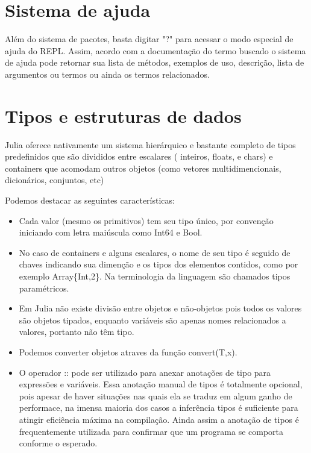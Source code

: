 \section{Sistema de ajuda}
Além do sistema de pacotes, basta digitar "?" para acessar o modo especial de ajuda do REPL. Assim, acordo com a documentação do termo buscado o sistema de ajuda pode retornar sua lista de métodos, exemplos de uso, descrição, lista de argumentos ou termos ou ainda os termos relacionados.


\section{Tipos e estruturas de dados}
Julia oferece nativamente um sistema hierárquico e bastante completo de tipos predefinidos que são divididos entre escalares ( inteiros, floats, e chars) e containers que acomodam outros objetos (como vetores multidimencionais, dicionários, conjuntos, etc)

Podemos destacar as seguintes características\cite{Lobianco2019}: 
\begin{itemize}
    \item Cada valor (mesmo os primitivos) tem seu tipo único, por convenção iniciando com letra maiúscula como Int64 e Bool. 
    \item No caso de containers e alguns escalares, o nome de seu tipo é seguido de chaves indicando sua dimenção e os tipos dos elementos contidos, como por exemplo Array\{Int,2\}. Na terminologia da linguagem são chamados tipos paramétricos.  
    \item Em Julia não existe divisão entre objetos e não-objetos pois todos os valores são objetos tipados, enquanto variáveis são apenas nomes relacionados a valores, portanto não têm tipo. 
    \item Podemos converter objetos atraves da função convert(T,x).
    \item O operador :: pode ser utilizado para anexar anotações de tipo para expressões e variáveis. Essa anotação manual de tipos é totalmente opcional, pois apesar de haver situações nas quais ela se traduz em algum ganho de performace, na imensa maioria dos casos a inferência tipos é suficiente para atingir eficiência máxima na compilação. Ainda assim a anotação de tipos é frequentemente utilizada para confirmar que um programa se comporta conforme o esperado. \cite{Bezanson2017}
    
\end{itemize}


